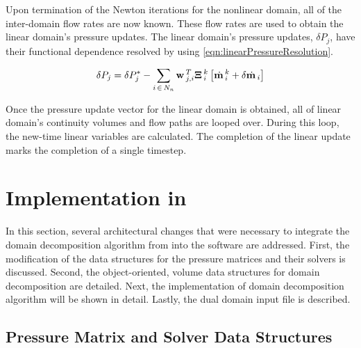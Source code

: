 Upon termination of the Newton iterations for the nonlinear domain, all of the inter-domain flow rates are now known.
These flow rates are used to obtain the linear domain's pressure updates.
The linear domain's pressure updates, $\delta P_{j}$, have their functional dependence resolved by using \eqref{eqn:linearPressureResolution}.

\begin{equation}
\label{eqn:linearPressureResolution}
\delta P_{j} = \delta P^{*}_{j} - \sum_{i\,\in \, N_{n}} \vec{w}_{j,i}^{T} \vec{\Xi}^{k}_{i} \left[ \momVec{}^{k}_{i} + \delta \momVec{}_{i}\right]
\end{equation}

Once the pressure update vector for the linear domain is obtained, all of linear domain's continuity volumes and flow paths are looped over.
During this loop, the new-time linear variables are calculated.
The completion of the linear update marks the completion of a single timestep.

\section{Implementation in \cobra{}}
\label{sec:dd_algo}

In this section, several architectural changes that were necessary to integrate the domain decomposition algorithm from  into the \cobra{} software are addressed.
First, the modification of the data structures for the pressure matrices and their solvers is discussed.
Second, the object-oriented, volume data structures for domain decomposition are detailed.
Next, the implementation of domain decomposition algorithm will be shown in detail.
Lastly, the dual domain input file is described.

\subsection{Pressure Matrix and Solver Data Structures}
\label{subsect:domDecompSolverStructs}

